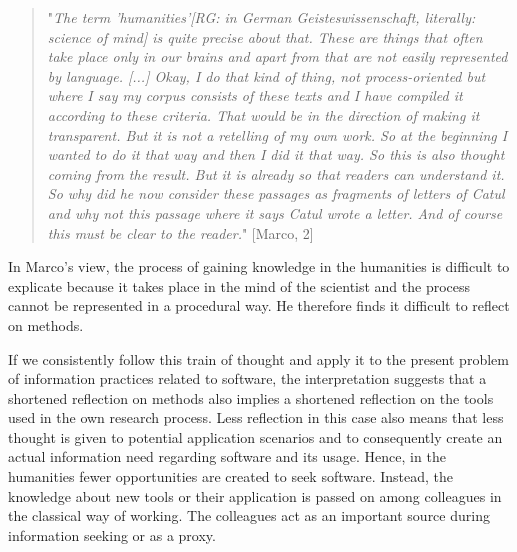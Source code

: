 \documentclass[12pt, a4paper, titlepage, oneside, abstract=true, toc=listof, toc=bibliography]{scrreprt}
\begin{document}
{%
\begin{quotation}
"\textit{The term 'humanities'[RG: in German Geisteswissenschaft, literally: science of mind] is quite precise about that. These are things that often take place only in our brains and apart from that are not easily represented by language. [...] Okay, I do that kind of thing, not process-oriented but where I say my corpus consists of these texts and I have compiled it according to these criteria. That would be in the direction of making it transparent. But it is not a retelling of my own work. So at the beginning I wanted to do it that way and then I did it that way. So this is also thought coming from the result. But it is already so that readers can understand it. So why did he now consider these passages as fragments of letters of Catul and why not this passage where it says Catul wrote a letter. And of course this must be clear to the reader.}" [Marco, 2]
\end{quotation}

In Marco's view, the process of gaining knowledge in the humanities is difficult to explicate because it takes place in the mind of the scientist and the process cannot be represented in a procedural way. He therefore finds it difficult to reflect on methods.

If we consistently follow this train of thought and apply it to the present problem of information practices related to software, the interpretation suggests that a shortened reflection on methods also implies a shortened reflection on the tools used in the own research process. Less reflection in this case also means that less thought is given to potential application scenarios and to consequently create an actual information need regarding software and its usage. Hence, in the humanities fewer opportunities are created to seek software. Instead, the knowledge about new tools or their application is passed on among colleagues in the classical way of working. The colleagues act as an important source during information seeking or as a proxy. 


}
\end{document}
